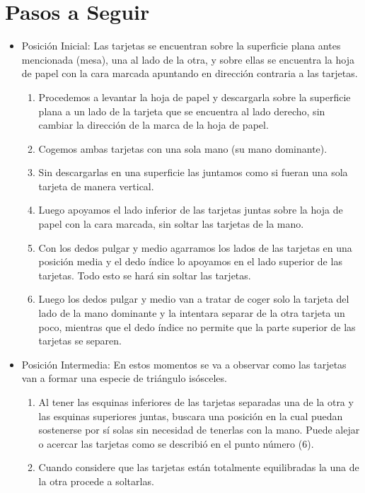 \documentclass{article}
\begin{document}
\section{Pasos a Seguir} \label{pasos}
\begin{itemize}
    \item Posición Inicial: Las tarjetas se encuentran sobre la superficie plana antes mencionada (mesa), una al lado de la otra, y sobre ellas se encuentra la hoja de papel con la cara marcada apuntando en dirección contraria a las tarjetas.
    \begin{enumerate}
        \item Procedemos a levantar la hoja de papel y descargarla sobre la superficie plana a un lado de la tarjeta que se encuentra al lado derecho, sin cambiar la dirección de la marca de la hoja de papel.
        \item Cogemos ambas tarjetas con una sola mano (su mano dominante).
        \item Sin descargarlas en una superficie las juntamos como si fueran una sola tarjeta de manera vertical.
        \item Luego apoyamos el lado inferior de las tarjetas juntas sobre la hoja de papel con la cara marcada, sin soltar las tarjetas de la mano.
        \item Con los dedos pulgar y medio agarramos los lados de las tarjetas en una posición media y el dedo índice lo apoyamos en el lado superior de las tarjetas. Todo esto se hará sin soltar las tarjetas.
        \item Luego los dedos pulgar y medio van a tratar de coger solo la tarjeta del lado de la mano dominante y la intentara separar de la otra tarjeta un poco, mientras que el dedo índice no permite que la parte superior de las tarjetas se separen.
    \end{enumerate}
    \item Posición Intermedia: En estos momentos se va a observar como las tarjetas van a formar una especie de triángulo isósceles.
    \begin{enumerate}
        \item Al tener las esquinas inferiores de las tarjetas separadas una de la otra y las esquinas superiores juntas, buscara una posición en la cual puedan sostenerse por sí solas sin necesidad de tenerlas con la mano. Puede alejar o acercar las tarjetas como se describió en el punto número (6).
        \item Cuando considere que las tarjetas están totalmente equilibradas la una de la otra procede a soltarlas.

\end{enumerate}
\end{itemize}
\end{document}
